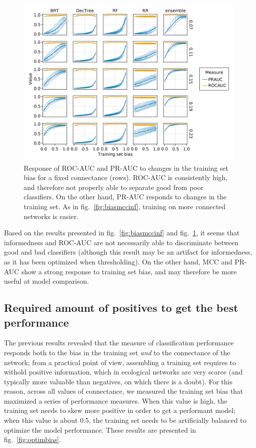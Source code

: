 \documentclass[10pt,oneside]{article}
\makeatletter
\def\maxwidth{\ifdim\Gin@nat@width>\linewidth\linewidth
\else\Gin@nat@width\fi}
\let\Oldincludegraphics\includegraphics
\renewcommand{\includegraphics}[1]{\Oldincludegraphics[width=\maxwidth]{#1}}
\makeatother
\begin{document}
\begin{figure}
\hypertarget{fig:biasrocpr}{%
\centering
\includegraphics{figures/bias_roc_pr.png}
\caption{Response of ROC-AUC and PR-AUC to changes in the training set
bias for a fixed connectance (rows). ROC-AUC is consistently high, and
therefore not properly able to separate good from poor classifiers. On
the other hand, PR-AUC responds to changes in the training set. As in
fig.~\ref{fig:biasmccinf}, training on more connected networks is
easier.}\label{fig:biasrocpr}
}
\end{figure}

Based on the results presented in fig.~\ref{fig:biasmccinf} and
fig.~\ref{fig:biasrocpr}, it seems that informedness and ROC-AUC are not
necessarily able to discriminate between good and bad classifiers
(although this result may be an artifact for informedness, as it has
been optimized when thresholding). On the other hand, MCC and PR-AUC
show a strong response to training set bias, and may therefore be more
useful at model comparison.

\hypertarget{required-amount-of-positives-to-get-the-best-performance}{%
\subsection{Required amount of positives to get the best
performance}\label{required-amount-of-positives-to-get-the-best-performance}}

The previous results revealed that the measure of classification
performance responds both to the bias in the training set \emph{and} to
the connectance of the network; from a practical point of view,
assembling a training set requires to withold positive information,
which in ecological networks are very scarce (and typically more
valuable than negatives, on which there is a doubt). For this reason,
across all values of connectance, we measured the training set bias that
maximized a series of performance measures. When this value is high, the
training set needs to skew more positive in order to get a performant
model; when this value is about 0.5, the training set needs to be
artificially balanced to optimize the model performance. These results
are presented in fig.~\ref{fig:optimbias}.
\end{document}
